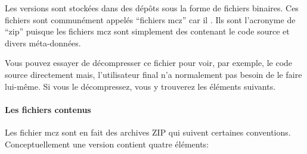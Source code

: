 \documentclass[a4paper,10pt,twoside]{book}
\begin{document}
Les versions sont stockées dans des dépôts sous la forme de fichiers
binaires. Ces fichiers sont communément appelés ``fichiers mcz'' car
il . %
Ils sont l'acronyme de 
 ``\MC zip'' puisque les fichiers mcz sont simplement des  contenant le code source et divers
méta-données.



Vous pouvez essayer de décompresser ce fichier pour voir, par exemple,
le code source directement mais, l'utilisateur final n'a normalement
pas besoin de le faire lui-même.
Si vous le décompressez, vous y trouverez les éléments suivants.

\paragraph{Les fichiers contenus}%

Les fichier mcz sont en fait des archives ZIP qui suivent certaines
conventions.
Conceptuellement une version contient quatre éléments:
\end{document}
